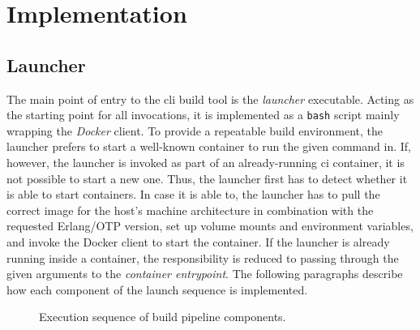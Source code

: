 \section{Implementation}

\subsection{Launcher} The main point of entry to the \acrshort{cli} build tool is the \emph{launcher} executable. Acting as the starting point for all invocations, it is implemented as a \lstinline|bash| script mainly wrapping the \emph{Docker} client. To provide a repeatable build environment, the launcher prefers to start a well-known container to run the given command in. If, however, the launcher is invoked as part of an already-running \acrshort{ci} container, it is not possible to start a new one. Thus, the launcher first has to detect whether it is able to start containers. In case it is able to, the launcher has to pull the correct image for the host's machine architecture in combination with the requested Erlang/OTP version, set up volume mounts and environment variables, and invoke the Docker client to start the container. If the launcher is already running inside a container, the responsibility is reduced to passing through the given arguments to the \emph{container entrypoint}. The following paragraphs describe how each component of the launch sequence is implemented.

\begin{figure}[h]
  \centering
  \caption{Execution sequence of build pipeline components.}
\end{figure}

